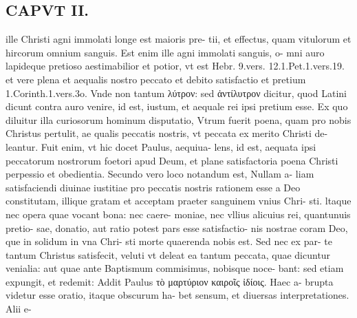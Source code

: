 \documentclass{article}
\begin{document}
\begin{pages}
\section*{CAPVT  II. }
\marginpar{[ p.61 ]}\pstart ille Christi agni immolati longe est maioris pre- tii, et effectus, quam vitulorum et hircorum omnium sanguis. Est enim ille agni immolati sanguis, o- mni auro lapideque pretioso aestimabilior et potior, vt est Hebr. 9.vers. 12.1.Pet.1.vers.19. et vere plena et aequalis nostro peccato et debito satisfactio et pretium 1.Corinth.1.vers.3o. Vnde non tantum λύτρον: sed ἀντίλυτρον dicitur, quod Latini dicunt contra auro venire, id est, iustum, et aequale rei ipsi pretium esse. Ex quo diluitur illa curiosorum hominum disputatio, Vtrum fuerit poena, quam pro nobis Christus pertulit, ae qualis peccatis nostris, vt peccata ex merito Christi de- leantur. Fuit enim, vt hic docet Paulus, aequiua- lens, id est, aequata ipsi peccatorum nostrorum foetori apud Deum, et plane satisfactoria poena Christi perpessio et obedientia. Secundo vero loco notandum est, Nullam a- liam satisfaciendi diuinae iustitiae pro peccatis nostris rationem esse a Deo constitutam, illique gratam et acceptam praeter sanguinem vnius Chri- sti. ltaque nec opera quae vocant bona: nec caere- moniae, nec vllius alicuius rei, quantunuis pretio- sae, donatio, aut ratio potest pars esse satisfactio- nis nostrae coram Deo, que in solidum in vna Chri- sti morte quaerenda nobis est. Sed nec ex par- te tantum Christus satisfecit, veluti vt deleat ea tantum peccata, quae dicuntur venialia: aut quae ante Baptismum commisimus, nobisque noce- bant: sed etiam expungit, et redemit: Addit Paulus τὸ μαρτύριον καιροῖς ἰδίοις. Haec a- brupta videtur esse oratio, itaque obscurum ha- bet sensum, et diuersas interpretationes. Alii e-  \pend

\end{pages}
\end{document}
